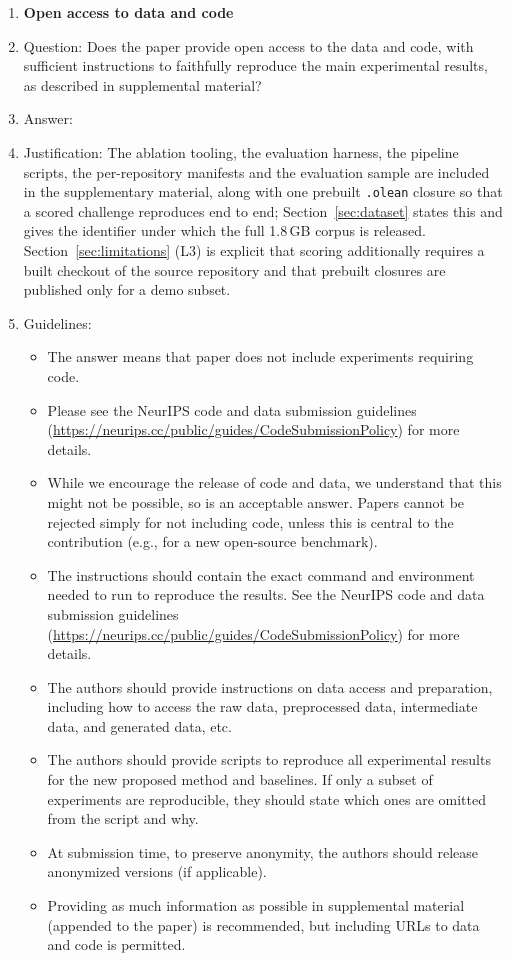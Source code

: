 \begin{enumerate}
\item {\bf Open access to data and code}
    \item[] Question: Does the paper provide open access to the data and code, with sufficient instructions to faithfully reproduce the main experimental results, as described in supplemental material?
    \item[] Answer: \answerYes{}
    \item[] Justification: The ablation tooling, the evaluation harness, the pipeline scripts, the per-repository manifests and the evaluation sample are included in the supplementary material, along with one prebuilt \texttt{.olean} closure so that a scored challenge reproduces end to end; Section~\ref{sec:dataset} states this and gives the identifier under which the full 1.8\,GB corpus is released. Section~\ref{sec:limitations} (L3) is explicit that scoring additionally requires a built checkout of the source repository and that prebuilt closures are published only for a demo subset.
    \item[] Guidelines:
    \begin{itemize}
        \item The answer \answerNA{} means that paper does not include experiments requiring code.
        \item Please see the NeurIPS code and data submission guidelines (\url{https://neurips.cc/public/guides/CodeSubmissionPolicy}) for more details.
        \item While we encourage the release of code and data, we understand that this might not be possible, so \answerNo{} is an acceptable answer. Papers cannot be rejected simply for not including code, unless this is central to the contribution (e.g., for a new open-source benchmark).
        \item The instructions should contain the exact command and environment needed to run to reproduce the results. See the NeurIPS code and data submission guidelines (\url{https://neurips.cc/public/guides/CodeSubmissionPolicy}) for more details.
        \item The authors should provide instructions on data access and preparation, including how to access the raw data, preprocessed data, intermediate data, and generated data, etc.
        \item The authors should provide scripts to reproduce all experimental results for the new proposed method and baselines. If only a subset of experiments are reproducible, they should state which ones are omitted from the script and why.
        \item At submission time, to preserve anonymity, the authors should release anonymized versions (if applicable).
        \item Providing as much information as possible in supplemental material (appended to the paper) is recommended, but including URLs to data and code is permitted.
    \end{itemize}



\end{enumerate}
